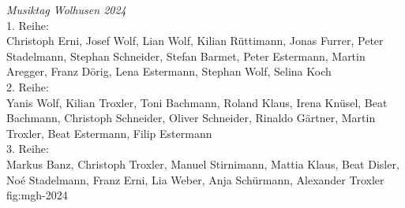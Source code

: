 {\emph{Musiktag Wolhusen 2024}\\
    1. Reihe:\\
    Christoph Erni, Josef Wolf, Lian Wolf, Kilian Rüttimann, Jonas Furrer, Peter
    Stadelmann, Stephan Schneider, Stefan Barmet, Peter Estermann, Martin
    Aregger, Franz Dörig, Lena Estermann, Stephan Wolf, Selina Koch\\
    2. Reihe:\\
    Yanis Wolf, Kilian Troxler, Toni Bachmann, Roland Klaus, Irena Knüsel, Beat
    Bachmann, Christoph Schneider, Oliver Schneider, Rinaldo Gärtner, Martin
    Troxler, Beat Estermann, Filip Estermann\\
    3. Reihe:\\
    Markus Banz, Christoph Troxler, Manuel Stirnimann, Mattia Klaus, Beat
    Disler, Noé Stadelmann, Franz Erni, Lia Weber, Anja Schürmann, Alexander Troxler
} {fig:mgh-2024}